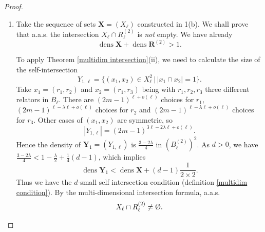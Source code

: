 \documentclass{article}
\DeclareMathOperator{\dens}{dens}
\newcommand{\vide}{\textup{\O}}
\newcommand{\bs}{\boldsymbol}
\theoremstyle{remark}
\begin{document}
\begin{proof}
\begin{enumerate}
\begin{enumerate}
        which means that $(A_\ell)$ is a sequence of fixed subsets of $(B_\ell)$ with density $1-\lambda$. By the intersection formula (Corollary \ref{random-fixed intersection}), because $1-\lambda+d<1$, we have a.a.s.
        \[A_\ell \cap R_\ell = \vide.\]
        \item Let $X_\ell$ be the set of distinct pairs of relators $r_1,r_2$ in $B_\ell$ having a piece (figure 2) longer than $\lambda\min\{|r_1|,|r_2|\}$. It is a fixed subset of $B_\ell^{(2)}$. We shall prove that a.a.s the intersection $X_\ell \cap R_\ell^{(2)}$ is empty.
        \begin{center}
        \end{center}
        There are $4\ell^2$ possible positions for pieces, $(2m-1)^{\ell+o(\ell)}$ choices for $r_1$ and $(2m-1)^{\ell-\lambda\ell+o(\ell)}$ choices for $r_2$. So 
        \[|X_\ell| = (2m-1)^{(2-\lambda)\ell+o(\ell)},\]
        which means that $(X_\ell)$ is a sequence of fixed subsets of $(B_\ell^{(2)})$ with density $1-\frac{\lambda}{2}$. By the multi-dimension intersection formula (Theorem \ref{multidim intersection} (i)), because $1-\frac{\lambda}{2}+d<1$, we have a.a.s.
        \[X_\ell \cap R_\ell^{(2)} = \vide.\]
    \end{enumerate}
    \item Take the sequence of sets $\bs X = (X_\ell)$ constructed in 1(b). We shall prove that a.a.s. the intersection $X_\ell \cap R_\ell^{(2)}$ is \textit{not} empty. We have already
    \[\dens \bs X + \dens \bs R^{(2)} > 1.\]
    
    To apply Theorem \ref{multidim intersection}(ii), we need to calculate the size of the self-intersection
    \[Y_{1,\ell} = \{(x_1,x_2)\in X_\ell^2 \, | \, |x_1 \cap x_2|=1\}.\]
    Take $x_1 = (r_1,r_2)$ and $x_2=(r_1,r_3)$ being with $r_1,r_2,r_3$ three different relators in $B_\ell$. There are $(2m-1)^{\ell + o(\ell)}$ choices for $r_1$, $(2m-1)^{\ell-\lambda\ell + o(\ell)}$ choices for $r_2$ and $(2m-1)^{\ell-\lambda\ell + o(\ell)}$ choices for $r_3$. Other cases of $(x_1,x_2)$ are symmetric, so
    \[|Y_{1,\ell}| = (2m-1)^{3\ell-2\lambda\ell + o(\ell)}.\]
    Hence the density of $\bs Y_1 = (Y_{1,\ell})$ is $\frac{3-2\lambda}{4}$ in $(B_\ell^{(2)})^2$. As $d>0$, we have $\frac{3-2\lambda}{4} < 1-\frac{\lambda}{2}+\frac{1}{4}(d-1)$, which implies
    \[\dens \bs Y_1 < \dens\bs X + (d-1)\frac{1}{2\times 2}.\]
    Thus we have the $d$-small self intersection condition (definition \ref{multidim condition}). By the multi-dimensional intersection formula, a.a.s.
    \[X_\ell \cap R_\ell^{(2)} \neq \vide.\]
\end{enumerate}
\end{proof}
\end{document}
